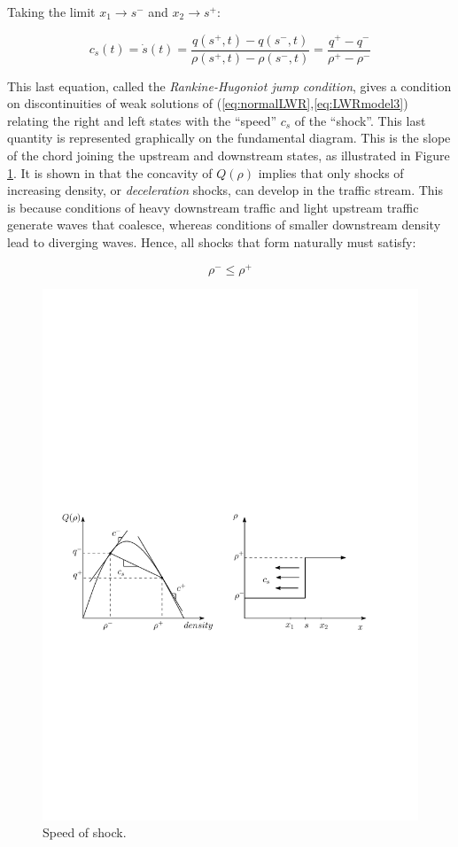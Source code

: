 \documentclass[letterpaper,10pt]{article}
\begin{document}
Taking the limit $x_{1} \rightarrow s^{-}$ and $x_{2} \rightarrow s^{+}$:

\begin{equation} \label{eq:speedShock}
c_{s}(t) = \dot{s}(t) = \frac{q(s^{+},t)-q(s^{-},t)}{\rho(s^{+},t)-\rho(s^{-},t)} = \frac{q^{+}-q^{-}}{\rho^{+}-\rho^{-}}
\end{equation}

This last equation, called the \textit{Rankine-Hugoniot jump condition}, gives a condition on discontinuities of weak solutions of (\ref{eq:normalLWR},\ref{eq:LWRmodel3}) relating the right and left states with the ``speed'' $c_{s}$ of the ``shock''. This last quantity is represented graphically on the fundamental diagram. This is the slope of the chord joining the upstream and downstream states, as illustrated in Figure \ref{fig:speedShock}. It is shown in \cite{Whitham1999} that the concavity of $Q(\rho)$ implies that only shocks of increasing density, or \textit{deceleration} shocks, can develop in the traffic stream. This is because conditions of heavy downstream traffic and light upstream traffic generate waves that coalesce, whereas conditions of smaller downstream density lead to diverging waves. Hence, all shocks that form naturally must satisfy:

\begin{equation} \label{eq:shocksCondition}
\rho^{-} \leq \rho^{+}
\end{equation}

\begin{figure}[here]
  \centering
    \includegraphics[width=12cm]{speed_of_shock.pdf}
    \caption{Speed of shock.}
    \label{fig:speedShock}
\end{figure}
\end{document}

